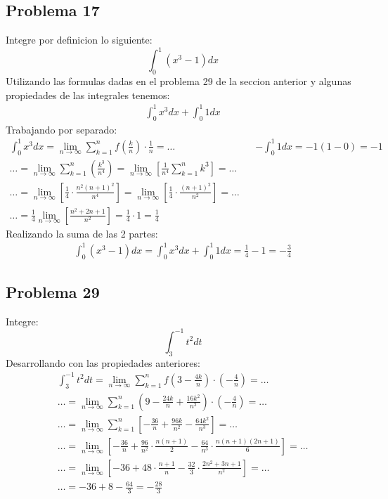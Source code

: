 \documentclass{article}
\begin{document}
      \subsection{Problema 17}
      Integre por definicion lo siguiente:
      $$\int_{0}^{1}(x^3 -1)dx$$
      Utilizando las formulas dadas en el problema 29 de la seccion anterior y algunas propiedades de las integrales tenemos:
      \begin{align*}
        \int_{0}^{1} x^3dx + \int_{0}^{1} 1dx
      \end{align*}
      Trabajando por separado:
      \begin{align*}
        \int_{0}^{1} x^3dx =\lim_{n\to\infty} \sum_{k=1}^{n}f\left(\frac{k}{n}\right)\cdot\frac{1}{n} = \dots && -\int_{0}^{1}1dx = -1(1-0) = -1 \\
        \dots = \lim_{n\to\infty} \sum_{k=1}^{n} \left(\frac{k^3}{n^4}\right) = \lim_{n\to\infty} \left[\frac{1}{n^4}\sum_{k=1}^{n}k^3\right]=\dots \\ \dots = \lim_{n\to\infty}\left[\frac{1}{4}\cdot\frac{n^2(n+1)^2}{n^4}\right] = \lim_{n\to\infty}\left[\frac{1}{4}\cdot\frac{(n+1)^2}{n^2}\right]= \dots \\ \dots = \frac{1}{4} \lim_{n\to\infty}\left[\frac{n^2+2n+1}{n^2}\right] = \frac{1}{4} \cdot 1 = \frac{1}{4}
      \end{align*}
      Realizando la suma de las 2 partes:
      \begin{align*}
        \int_{0}^{1}(x^3 -1)dx = \int_{0}^{1} x^3dx + \int_{0}^{1} 1dx  = \frac{1}{4} -1 = -\frac{3}{4}
      \end{align*}
      \subsection{Problema 29}
      Integre:
      $$\int_{3}^{-1}t^2dt$$
      Desarrollando con las propiedades anteriores:
      \begin{align*}
        \int_{3}^{-1} t^2 dt = \lim_{n\to\infty}\sum_{k=1}^{n}f\left(3-\frac{4k}{n}\right)\cdot\left(-\frac{4}{n}\right) =\dots \\\dots = \lim_{n\to\infty}\sum_{k=1}^{n}\left(9-\frac{24k}{n}+\frac{16k^2}{n^2}\right)\cdot\left(-\frac{4}{n}\right) = \dots \\ \dots = \lim_{n\to\infty}\sum_{k=1}^{n}\left[-\frac{36}{n}+\frac{96k}{n^2}-\frac{64k^2}{n^3}\right] = \dots \\ \dots = \lim_{n\to\infty}\left[-\frac{36}{n}+\frac{96}{n^2}\cdot\frac{n(n+1)}{2}-\frac{64}{n^3}\cdot\frac{n(n+1)(2n+1)}{6}\right]=\dots \\ \dots = \lim_{n\to\infty}\left[-36+48\cdot\frac{n+1}{n}-\frac{32}{3}\cdot\frac{2n^2+3n+1}{n^2}\right]=\dots \\ \dots = -36+8-\frac{64}{3} = - \frac{28}{3}
      \end{align*}
\end{document}
